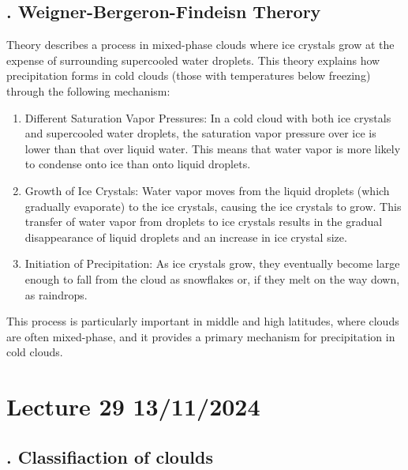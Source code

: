 \documentclass[fleqn,10pt]{SelfArx} %
\begin{document}
\subsection{. Weigner-Bergeron-Findeisn Therory}
Theory describes a process in mixed-phase clouds where ice crystals grow at the expense of surrounding supercooled water droplets. This theory explains how precipitation forms in cold clouds (those with temperatures below freezing) through the following mechanism:

\begin{enumerate}
    \item Different Saturation Vapor Pressures: In a cold cloud with both ice crystals and supercooled water droplets, the saturation vapor pressure over ice is lower than that over liquid water. This means that water vapor is more likely to condense onto ice than onto liquid droplets.
    \item Growth of Ice Crystals: Water vapor moves from the liquid droplets (which gradually evaporate) to the ice crystals, causing the ice crystals to grow. This transfer of water vapor from droplets to ice crystals results in the gradual disappearance of liquid droplets and an increase in ice crystal size.
    \item Initiation of Precipitation: As ice crystals grow, they eventually become large enough to fall from the cloud as snowflakes or, if they melt on the way down, as raindrops.
\end{enumerate}

This process is particularly important in middle and high latitudes, where clouds are often mixed-phase, and it provides a primary mechanism for precipitation in cold clouds.

\clearpage

\section{Lecture 29 13/11/2024}


\subsection{. Classifiaction of cloulds}
\end{document}
